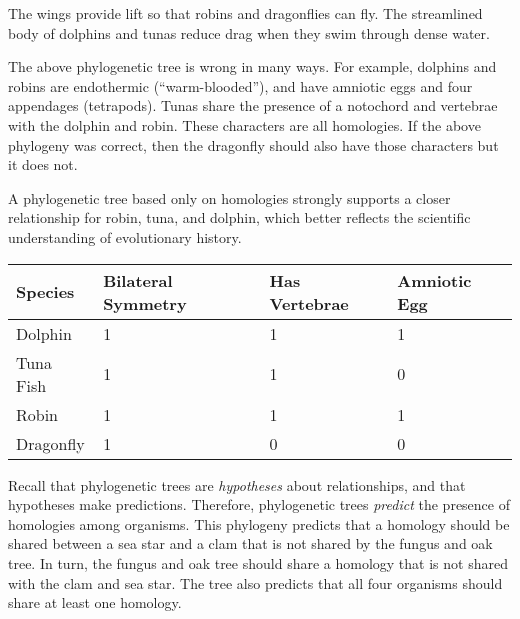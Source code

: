 \documentclass[12pt, hidelinks]{exam}
\begin{document}
\bigskip

The wings provide lift so that robins and dragonflies can fly. The streamlined
body of dolphins and tunas reduce drag when they swim through dense water.

The above phylogenetic tree is wrong in many ways. For example, dolphins and robins
 are endothermic (“warm-blooded”), and have amniotic eggs and four appendages
 (tetrapods). Tunas share the presence of a notochord and vertebrae with the 
 dolphin and robin. These characters are all homologies. If the above phylogeny was
 correct, then the dragonfly should also have those characters but it does not.

A phylogenetic tree based only on homologies strongly supports a closer relationship 
for robin, tuna, and dolphin, which better reflects the scientific understanding of 
evolutionary history.

\begin{center}
	\begin{tabular}{lC{0.8in}C{0.7in}C{0.8in}}
		\toprule
		Species	& Bilateral Symmetry	&	Has Vertebrae	&	Amniotic Egg \tabularnewline
		\midrule
		Dolphin 	&	1						&	1					&	1	\tabularnewline 
		Tuna Fish	&	1						&	1					&	0	\tabularnewline
		Robin		&	1						&	1					&	1	\tabularnewline
		Dragonfly	&	1						&	0					&	0	\tabularnewline
		\bottomrule
	\end{tabular}

\bigskip


\end{center}

\bigskip

Recall that phylogenetic trees are \emph{hypotheses} about relationships,
and that hypotheses make predictions. Therefore, phylogenetic trees 
\emph{predict} the presence of homologies among organisms. This phylogeny
predicts that a homology should be shared between a sea star and a clam that
is not shared by the fungus and oak tree. In turn, the fungus and
oak tree should share a homology that is not shared with the clam and sea star. 
The tree also predicts that all four organisms should share at least one
homology.
\end{document}
